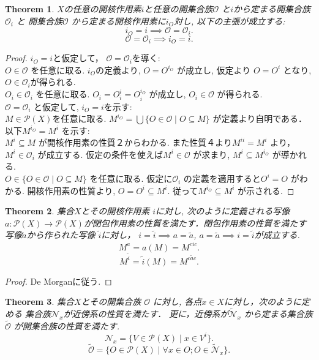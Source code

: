 \documentclass[dvipdfmx]{jbook}
\newtheorem{theorem}{Theorem}[section]
\theoremstyle{remark}
\theoremstyle{plain}
\begin{document}
\begin{theorem}
	$X$の任意の開核作用素$i$と任意の開集合族$\mathcal{O}$ 
	と$i$から定まる開集合族 $\mathcal{O}_i$ と
	開集合族$\mathcal{O}$ から定まる開核作用素に$i_O$対し, 以下の主張が成立する:
	\[
	i_O = i \implies \mathcal{O} = \mathcal{O}_i
	.\] 
	\[
	\mathcal{O} = \mathcal{O}_i \implies i_O = i
	.\] 
\end{theorem}

\begin{proof}
	$i_O = i $と仮定して， $\mathcal{O} = \mathcal{O}_i$を導く:\\
	$O \in \mathcal{O}$ を任意に取る. $i_O$の定義より,  $O = O^{i_O}$ が成立し, 
	仮定より $O = O ^{i}$ となり, $O \in \mathcal{O}_i$が得られる.\\
	$O_i \in \mathcal{O}_i$ を任意に取る. $O_i = O_i^{i} = O_i^{i_O}$ が成立し, $O_i \in \mathcal{O}$ が得られる.\\
	$\mathcal{O} = \mathcal{O}_i$ と仮定して, $i_O =i$を示す:\\
	 $M \in \mathcal{P}(X)$を任意に取る. 
	 $M ^{i_O} = \bigcup \{O \in \mathcal{O} \mid O\subseteq M\} $ が定義より自明である．\\
	 以下$M^{i_O} = M^{i}$ を示す:\\
	 $M^{i} \subseteq M$ が開核作用素の性質２からわかる.
	 また性質４より$M^{ii}=M^{i}$ より，$M^{i} \in \mathcal{O}_i$ が成立する. 
	 仮定の条件を使えば$M^{i} \in \mathcal{O}$ が求まり, $M^{i} \subseteq M^{i_O}$ が導かれる.\\
	 $O \in \{O \in \mathcal{O} \mid O\subseteq M\} $ を任意に取る. 
	 仮定に$\mathcal{O}_i$ の定義を適用すると$O^{i}= O$ がわかる.
	 開核作用素の性質より, $O = O^{i} \subseteq M^{i}$. 従って$M^{i_O} \subseteq  M^{i}$ が示される.
\end{proof}

\begin{theorem}
	集合$X$とその開核作用素 $i$に対し,  次のように定義される写像$a : \mathcal{P}(X) \to \mathcal{P}(X)$が閉包作用素の性質を満たす．閉包作用素の性質を満たす写像$\tilde{a}$から作られた写像 $\tilde{i}$に対し，  $ i = \tilde{i} \implies a = \tilde{a}$, $a =\tilde{a} \implies i = \tilde{i}$が成立する.
	\[
		M^{a}= a(M) = M^{cic}
	.\] 
	\[
		M^{\tilde{i}}= \tilde{i}(M) = M^{c\tilde{a}c}
	.\] 
\end{theorem}

\begin{proof}
	De Morganに従う.
\end{proof}

\begin{theorem}
	集合$X$とその開集合族 $\mathcal{O}$ に対し, 各点$x \in X$に対し，次のように定める 集合族$\mathcal{N}_x$が近傍系の性質を満たす． 更に，近傍系が$\mathcal{\tilde{N}}_x$ から定まる集合族$\tilde{\mathcal{O}}$ が開集合族の性質を満たす.
	\[
	 \mathcal{N}_x =\{ V \in \mathcal{P}(X)  \mid  x \in V^{i}\} 
	.\] 
	\[
		\tilde{\mathcal{O}}= \{ O \in \mathcal{P}(X)  \mid \forall x \in O; O \in \mathcal{\tilde{N}}_x\} 
	.\] 
\end{theorem}
\end{document}
